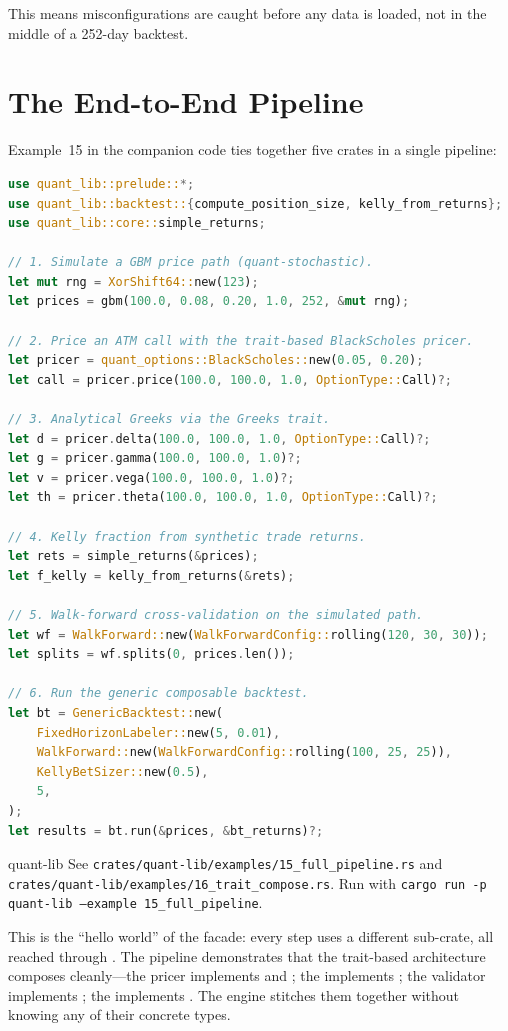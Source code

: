 This means misconfigurations are caught before any data is loaded,
not in the middle of a 252-day backtest.

\section{The End-to-End Pipeline}

Example~15 in the companion code ties together five crates in a
single pipeline:

\begin{lstlisting}[language=Rust]
use quant_lib::prelude::*;
use quant_lib::backtest::{compute_position_size, kelly_from_returns};
use quant_lib::core::simple_returns;

// 1. Simulate a GBM price path (quant-stochastic).
let mut rng = XorShift64::new(123);
let prices = gbm(100.0, 0.08, 0.20, 1.0, 252, &mut rng);

// 2. Price an ATM call with the trait-based BlackScholes pricer.
let pricer = quant_options::BlackScholes::new(0.05, 0.20);
let call = pricer.price(100.0, 100.0, 1.0, OptionType::Call)?;

// 3. Analytical Greeks via the Greeks trait.
let d = pricer.delta(100.0, 100.0, 1.0, OptionType::Call)?;
let g = pricer.gamma(100.0, 100.0, 1.0)?;
let v = pricer.vega(100.0, 100.0, 1.0)?;
let th = pricer.theta(100.0, 100.0, 1.0, OptionType::Call)?;

// 4. Kelly fraction from synthetic trade returns.
let rets = simple_returns(&prices);
let f_kelly = kelly_from_returns(&rets);

// 5. Walk-forward cross-validation on the simulated path.
let wf = WalkForward::new(WalkForwardConfig::rolling(120, 30, 30));
let splits = wf.splits(0, prices.len());

// 6. Run the generic composable backtest.
let bt = GenericBacktest::new(
    FixedHorizonLabeler::new(5, 0.01),
    WalkForward::new(WalkForwardConfig::rolling(100, 25, 25)),
    KellyBetSizer::new(0.5),
    5,
);
let results = bt.run(&prices, &bt_returns)?;
\end{lstlisting}

\begin{companioncode}{quant-lib}
See \texttt{crates/quant-lib/examples/15\_full\_pipeline.rs} and
\texttt{crates/quant-lib/examples/16\_trait\_compose.rs}. Run with
\texttt{cargo run -p quant-lib --example 15\_full\_pipeline}.
\end{companioncode}

This is the ``hello world'' of the facade: every step uses a different
sub-crate, all reached through . The pipeline
demonstrates that the trait-based architecture composes cleanly---the
 pricer implements  and
; the  implements
; the  validator implements
; the  implements
. The  engine stitches them
together without knowing any of their concrete types.

